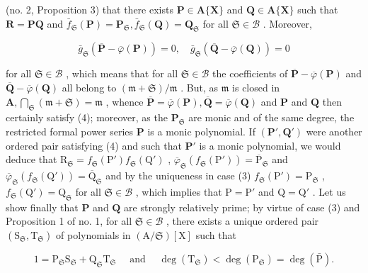 (no. 2, Proposition 3) that there exists \(\mathbf{P} \in \mathbf{A}\{\mathbf{X}\}\) and \(\mathbf{Q} \in \mathbf{A}\{\mathbf{X}\}\) such that \(\mathbf{R} = \mathbf{PQ}\) and \(\bar{f}_{\mathfrak{S}}(\mathbf{P}) = \mathbf{P}_{\mathfrak{S}}, \bar{f}_{\mathfrak{S}}(\mathbf{Q}) = \mathbf{Q}_{\mathfrak{S}}\) for all \(\mathfrak{S} \in \mathcal{B}\) . Moreover,

\[
\bar {g} _ {\mathfrak {S}} (\overline {{{\mathbf {P}}}} - \overline {{{\varphi}}} (\mathbf {P})) = 0, \quad \bar {g} _ {\mathfrak {S}} (\overline {{{\mathbf {Q}}}} - \overline {{{\varphi}}} (\mathbf {Q})) = 0
\]

for all \(\mathfrak{S} \in \mathcal{B}\) , which means that for all \(\mathfrak{S} \in \mathcal{B}\) the coefficients of \(\overline{\mathbf{P}} - \overline{\varphi}(\mathbf{P})\) and \(\overline{\mathbf{Q}} - \overline{\varphi}(\mathbf{Q})\) all belong to \((\mathfrak{m} + \mathfrak{S})/\mathfrak{m}\) . But, as \(\mathfrak{m}\) is closed in \(\mathbf{A}, \bigcap_{\mathfrak{S}} (\mathfrak{m} + \mathfrak{S}) = \mathfrak{m}\) , whence \(\overline{\mathbf{P}} = \overline{\varphi}(\mathbf{P}), \overline{\mathbf{Q}} = \overline{\varphi}(\mathbf{Q})\) and \(\mathbf{P}\) and \(\mathbf{Q}\) then certainly satisfy (4); moreover, as the \(\mathbf{P}_{\mathfrak{S}}\) are monic and of the same degree, the restricted formal power series \(\mathbf{P}\) is a monic polynomial. If \((\mathbf{P}', \mathbf{Q}')\) were another ordered pair satisfying (4) and such that \(\mathbf{P}'\) is a monic polynomial, we would deduce that \(\mathrm{R}_{\mathfrak{S}} = f_{\mathfrak{S}}(\mathrm{P}') f_{\mathfrak{S}}(\mathrm{Q}')\) , \(\overline{\varphi}_{\mathfrak{S}}(f_{\mathfrak{S}}(\mathrm{P}')) = \overline{\mathrm{P}}_{\mathfrak{S}}\) and \(\overline{\varphi}_{\mathfrak{S}}(f_{\mathfrak{S}}(\mathrm{Q}')) = \overline{\mathrm{Q}}_{\mathfrak{S}}\) and by the uniqueness in case (3) \(f_{\mathfrak{S}}(\mathrm{P}') = \mathrm{P}_{\mathfrak{S}}\) , \(f_{\mathfrak{S}}(\mathrm{Q}') = \mathrm{Q}_{\mathfrak{S}}\) for all \(\mathfrak{S} \in \mathcal{B}\) , which implies that \(\mathrm{P} = \mathrm{P}'\) and \(\mathrm{Q} = \mathrm{Q}'\) . Let us show finally that \(\mathbf{P}\) and \(\mathbf{Q}\) are strongly relatively prime; by virtue of case (3) and Proposition 1 of no. 1, for all \(\mathfrak{S} \in \mathcal{B}\) , there exists a unique ordered pair \((\mathrm{S}_{\mathfrak{S}}, \mathrm{T}_{\mathfrak{S}})\) of polynomials in \((\mathrm{A}/\mathfrak{S})[\mathrm{X}]\) such that

\[
1 = \mathrm{P} _ {\mathfrak {S}} \mathrm{S} _ {\mathfrak {S}} + \mathrm{Q} _ {\mathfrak {S}} \mathrm{T} _ {\mathfrak {S}} \quad \text { and } \quad \deg (\mathrm{T} _ {\mathfrak {S}}) <   \deg (\mathrm{P} _ {\mathfrak {S}}) = \deg (\bar {\mathrm{P}}).\tag{7}
\]

